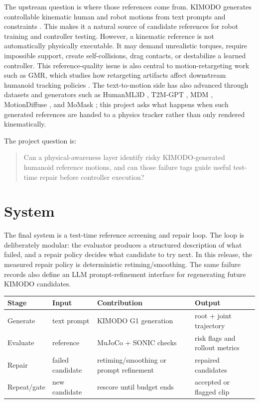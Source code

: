 \documentclass[10pt]{article}
\begin{document}
The upstream question is where those references come from. KIMODO generates
controllable kinematic human and robot motions from text prompts and
constraints \cite{kimodo}. This makes it a natural source of candidate
references for robot training and controller testing. However, a kinematic
reference is not automatically physically executable. It may demand unrealistic
torques, require impossible support, create self-collisions, drag contacts, or
destabilize a learned controller. This reference-quality issue is also central
to motion-retargeting work such as GMR, which studies how retargeting artifacts
affect downstream humanoid tracking policies \cite{gmr}.
The text-to-motion side has also advanced through datasets and generators such
as HumanML3D \cite{humanml3d}, T2M-GPT \cite{t2mgpt}, MDM \cite{mdm},
MotionDiffuse \cite{motiondiffuse}, and MoMask \cite{momask}; this project
asks what happens when such generated references are handed to a physics
tracker rather than only rendered kinematically.

The project question is:
\begin{quote}
Can a physical-awareness layer identify risky KIMODO-generated humanoid
reference motions, and can those failure tags guide useful test-time repair
before controller execution?
\end{quote}

\section{System}

The final system is a test-time reference screening and repair loop. The loop is
deliberately modular: the evaluator produces a structured description of what
failed, and a repair policy decides what candidate to try next. In this release,
the measured repair policy is deterministic retiming/smoothing. The same
failure records also define an LLM prompt-refinement interface for regenerating
future KIMODO candidates.

\begin{center}
\begin{tabular}{llll}
\toprule
Stage & Input & Contribution & Output \\
\midrule
Generate & text prompt & KIMODO G1 generation & root + joint trajectory \\
Evaluate & reference & MuJoCo + SONIC checks & risk flags and rollout metrics \\
Repair & failed candidate & retiming/smoothing or prompt refinement & repaired candidates \\
Repeat/gate & new candidate & rescore until budget ends & accepted or flagged clip \\
\bottomrule
\end{tabular}
\end{center}
\end{document}
